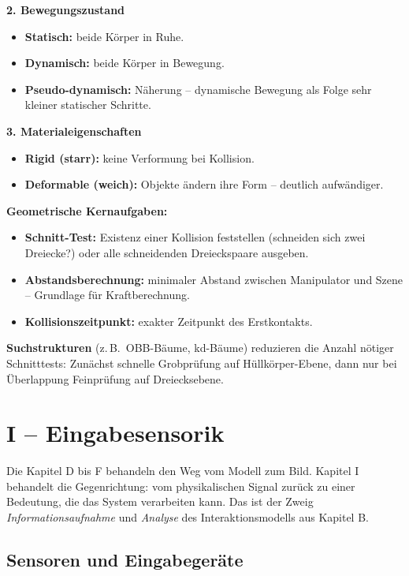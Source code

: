 \documentclass[12pt, a4paper]{article}
\begin{document}
\textbf{2. Bewegungszustand}
\begin{itemize}
  \item \textbf{Statisch:} beide Körper in Ruhe.
  \item \textbf{Dynamisch:} beide Körper in Bewegung.
  \item \textbf{Pseudo-dynamisch:} Näherung -- dynamische Bewegung als Folge sehr kleiner statischer Schritte.
\end{itemize}

\textbf{3. Materialeigenschaften}
\begin{itemize}
  \item \textbf{Rigid (starr):} keine Verformung bei Kollision.
  \item \textbf{Deformable (weich):} Objekte ändern ihre Form -- deutlich aufwändiger.
\end{itemize}

\textbf{Geometrische Kernaufgaben:}
\begin{itemize}
  \item \textbf{Schnitt-Test:} Existenz einer Kollision feststellen (schneiden sich zwei Dreiecke?) oder alle schneidenden Dreieckspaare ausgeben.
  \item \textbf{Abstandsberechnung:} minimaler Abstand zwischen Manipulator und Szene -- Grundlage für Kraftberechnung.
  \item \textbf{Kollisionszeitpunkt:} exakter Zeitpunkt des Erstkontakts.
\end{itemize}

\textbf{Suchstrukturen} (z.\,B.\ OBB-Bäume, kd-Bäume) reduzieren die Anzahl nötiger Schnitttests: Zunächst schnelle Grobprüfung auf Hüllkörper-Ebene, dann nur bei Überlappung Feinprüfung auf Dreiecksebene.

\section{I -- Eingabesensorik}

Die Kapitel D bis F behandeln den Weg vom Modell zum Bild. Kapitel I behandelt die
Gegenrichtung: vom physikalischen Signal zurück zu einer Bedeutung, die das System
verarbeiten kann. Das ist der Zweig \textit{Informationsaufnahme} und \textit{Analyse}
des Interaktionsmodells aus Kapitel B.

\subsection{Sensoren und Eingabegeräte}
\end{document}
